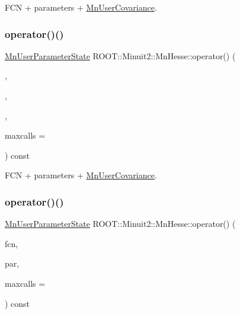F\+CN + parameters + \mbox{\hyperlink{classROOT_1_1Minuit2_1_1MnUserCovariance}{Mn\+User\+Covariance}}. 

\mbox{\label{classROOT_1_1Minuit2_1_1MnHesse_a5d575c4f72e0024578b07579a7e3a4a3}} 
\subsubsection{\texorpdfstring{operator()()}{operator()()}\hspace{0.1cm}{\footnotesize\ttfamily [9/24]}}
{\footnotesize\ttfamily \mbox{\hyperlink{classROOT_1_1Minuit2_1_1MnUserParameterState}{Mn\+User\+Parameter\+State}} R\+O\+O\+T\+::\+Minuit2\+::\+Mn\+Hesse\+::operator() (\begin{DoxyParamCaption}\item[{const \mbox{\hyperlink{classROOT_1_1Minuit2_1_1FCNBase}{F\+C\+N\+Base}} \&}]{,  }\item[{const std\+::vector$<$ double $>$ \&}]{,  }\item[{const \mbox{\hyperlink{classROOT_1_1Minuit2_1_1MnUserCovariance}{Mn\+User\+Covariance}} \&}]{,  }\item[{unsigned int}]{maxcalls = {} }\end{DoxyParamCaption}) const}



F\+CN + parameters + \mbox{\hyperlink{classROOT_1_1Minuit2_1_1MnUserCovariance}{Mn\+User\+Covariance}}. 

\mbox{\label{classROOT_1_1Minuit2_1_1MnHesse_ab7a2674f254e7f6056885d7d792ea671}} 
\subsubsection{\texorpdfstring{operator()()}{operator()()}\hspace{0.1cm}{\footnotesize\ttfamily [10/24]}}
{\footnotesize\ttfamily \mbox{\hyperlink{classROOT_1_1Minuit2_1_1MnUserParameterState}{Mn\+User\+Parameter\+State}} R\+O\+O\+T\+::\+Minuit2\+::\+Mn\+Hesse\+::operator() (\begin{DoxyParamCaption}\item[{const \mbox{\hyperlink{classROOT_1_1Minuit2_1_1FCNBase}{F\+C\+N\+Base}} \&}]{fcn,  }\item[{const \mbox{\hyperlink{classROOT_1_1Minuit2_1_1MnUserParameters}{Mn\+User\+Parameters}} \&}]{par,  }\item[{unsigned int}]{maxcalls = {} }\end{DoxyParamCaption}) const}

